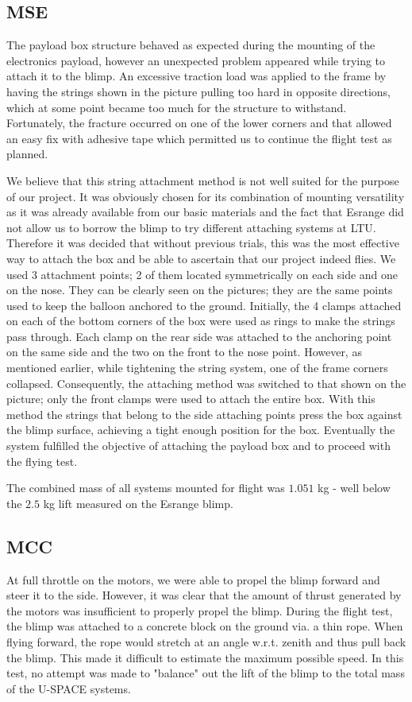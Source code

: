 \subsection{MSE}
The payload box structure behaved as expected during the mounting of the electronics payload, however an unexpected problem appeared while trying to attach it to the blimp.  An excessive traction load was applied to the frame by having the strings shown in the picture pulling too hard in opposite directions, which at some point became too much for the structure to withstand. Fortunately, the fracture occurred on one of the lower corners and that allowed an easy fix with adhesive tape which permitted us to continue the flight test as planned. 

We believe that this string attachment method is not well suited for the purpose of our project. It was obviously chosen for its combination of mounting versatility as it was already available from our basic materials and the fact that Esrange did not allow us to borrow the blimp to try different attaching systems at LTU. Therefore it was decided that without previous trials, this was the most effective way to attach the box and be able to ascertain that our project indeed flies. 
We used 3 attachment points; 2 of them located symmetrically on each side and one on the nose. They can be clearly seen on the pictures; they are the same points used to keep the balloon anchored to the ground.
Initially, the 4 clamps attached on each of the bottom corners of the box were used as rings to make the strings pass through. Each clamp on the rear side was attached to the anchoring point on the same side and the two on the front to the nose point. However, as mentioned earlier, while tightening the string system, one of the frame corners collapsed. Consequently, the attaching method was switched to that shown on the picture; only the front clamps were used to attach the entire box. With this method the strings that belong to the side attaching points press the box against the blimp surface, achieving a tight enough position for the box. 
Eventually the system fulfilled the objective of attaching the payload box and to proceed with the flying test. 

The combined mass of all systems mounted for flight was $1.051$ kg - well below the $2.5$ kg lift measured on the Esrange blimp.

\subsection{MCC}
At full throttle on the motors, we were able to propel the blimp forward and steer it to the side. However, it was clear that the amount of thrust generated by the motors was insufficient to properly propel the blimp. During the flight test, the blimp was attached to a concrete block on the ground via. a thin rope. When flying forward, the rope would stretch at an angle w.r.t. zenith and thus pull back the blimp. This made it difficult to estimate the maximum possible speed. In this test, no attempt was made to "balance" out the lift of the blimp to the total mass of the U-SPACE systems. 

